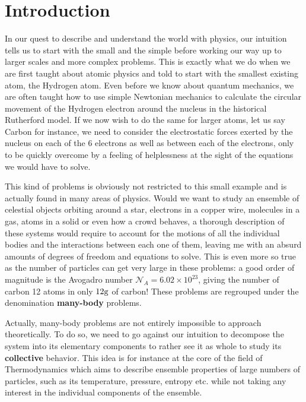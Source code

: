 \chapter*{Introduction}

\label{chap:intro}





In our quest to describe and understand the world with physics, our intuition tells us to start with the small and the simple before working our way up to larger scales and more complex problems. This is exactly what we do when we are first taught about atomic physics and told to start with the smallest existing atom, the Hydrogen atom. Even before we know about quantum mechanics, we are often taught how to use simple Newtonian mechanics to calculate the circular movement of the Hydrogen electron around the nucleus in the historical Rutherford model. If we now wish to do the same for larger atoms, let us say Carbon for instance, we need to consider the electrostatic forces exerted by the nucleus on each of the 6 electrons as well as between each of the electrons, only to be quickly overcome by a feeling of helplessness at the sight of the equations we would have to solve.


This kind of problems is obviously not restricted to this small example and is actually found in many areas of physics. Would we want to study an ensemble of celestial objects orbiting around a star, electrons in a copper wire, molecules in a gas, atoms in a solid or even how a crowd behaves, a thorough description of these systems would require to account for the motions of all the individual bodies and the interactions between each one of them, leaving me with an absurd amounts of degrees of freedom and equations to solve. This is even more so true as the number of particles can get very large in these problems: a good order of magnitude is the Avogadro number $\mathcal{N}_A = 6.02 \times 10^{23}$, giving the number of carbon 12 atoms in only $12\rm{g}$ of carbon! These problems are regrouped under the denomination \textbf{many-body} problems. 


Actually, many-body problems are not entirely impossible to approach theoretically. To do so, we need to go against our intuition to decompose the system into its elementary components to rather see it as whole to study its \textbf{collective} behavior. This idea is for instance at the core of the field of Thermodynamics which aims to describe ensemble properties of large numbers of particles, such as its temperature, pressure, entropy etc. while not taking any interest in the individual components of the ensemble.

